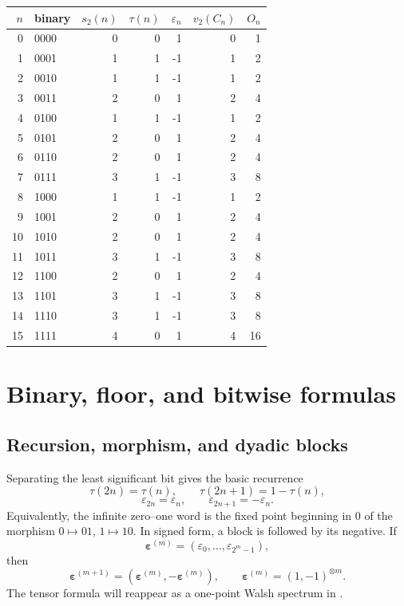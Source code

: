 \documentclass[11pt,oneside]{article}
\theoremstyle{definition}
\theoremstyle{remark}
\newcommand{\vtwo}{v_2}
\newcommand{\bitsum}{s_2}
\newcommand{\eps}{\varepsilon}
\begin{document}
\begin{center}
\small
\begin{tabular}{r@{\quad}lrrrrr}
\toprule
\(n\) & binary & \(\bitsum(n)\) & \(\tau(n)\) & \(\eps_n\) & \(\vtwo(C_n)\) & \(O_n\)\\
\midrule
0  & 0000 & 0 & 0 &  1 & 0 & 1\\
1  & 0001 & 1 & 1 & -1 & 1 & 2\\
2  & 0010 & 1 & 1 & -1 & 1 & 2\\
3  & 0011 & 2 & 0 &  1 & 2 & 4\\
4  & 0100 & 1 & 1 & -1 & 1 & 2\\
5  & 0101 & 2 & 0 &  1 & 2 & 4\\
6  & 0110 & 2 & 0 &  1 & 2 & 4\\
7  & 0111 & 3 & 1 & -1 & 3 & 8\\
8  & 1000 & 1 & 1 & -1 & 1 & 2\\
9  & 1001 & 2 & 0 &  1 & 2 & 4\\
10 & 1010 & 2 & 0 &  1 & 2 & 4\\
11 & 1011 & 3 & 1 & -1 & 3 & 8\\
12 & 1100 & 2 & 0 &  1 & 2 & 4\\
13 & 1101 & 3 & 1 & -1 & 3 & 8\\
14 & 1110 & 3 & 1 & -1 & 3 & 8\\
15 & 1111 & 4 & 0 &  1 & 4 & 16\\
\bottomrule
\end{tabular}
\end{center}

\section{Binary, floor, and bitwise formulas}
\label{sec:binary}

\subsection{Recursion, morphism, and dyadic blocks}

Separating the least significant bit gives the basic recurrence
\begin{equation}
  \tau(2n)=\tau(n),\qquad \tau(2n+1)=1-\tau(n),
  \label{eq:tau-recursion}
\end{equation}
\begin{equation}
  \eps_{2n}=\eps_n,\qquad \eps_{2n+1}=-\eps_n.
  \label{eq:eps-recursion}
\end{equation}
Equivalently, the infinite zero--one word is the fixed point beginning in
\(0\) of the morphism \(0\mapsto 01\), \(1\mapsto 10\).  In signed form, a
block is followed by its negative.  If
\[
  \bm\eps^{(m)}=(\eps_0,\ldots,\eps_{2^m-1}),
\]
then
\begin{equation}
  \bm\eps^{(m+1)}=(\bm\eps^{(m)},-\bm\eps^{(m)}),
  \qquad
  \bm\eps^{(m)}=(1,-1)^{\otimes m}.
  \label{eq:tensor-block}
\end{equation}
The tensor formula will reappear as a one-point Walsh spectrum in
.
\end{document}
